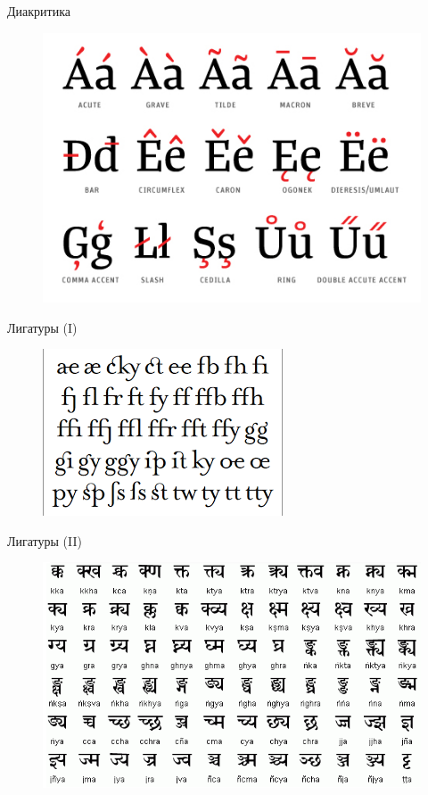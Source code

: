 \documentclass{beamer}
\begin{document}
\begin{frame}{Диакритика}
\begin{figure}[H]
    \includegraphics[scale=0.45]{diacritic.png} 
\end{figure}
\end{frame}

\begin{frame}{Лигатуры (I)}
\begin{figure}[H]
    \includegraphics[scale=0.8]{ligatura.png} 
\end{figure}
\end{frame}

\begin{frame}{Лигатуры (II)}
\begin{figure}[H]
    \includegraphics[scale=0.5]{devanagari.png} 
\end{figure}
\end{frame}
\end{document}
